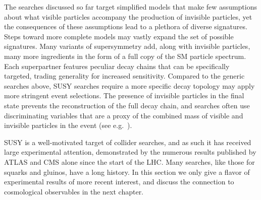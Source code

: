 

The searches discussed so far target simplified models that make few assumptions about what visible particles accompany the production of invisible particles, yet the consequences of these assumptions lead to a plethora of diverse signatures. 
Steps toward more complete models may vastly expand the set of possible signatures. Many variants of supersymmetry add, along with invisible particles, many more ingredients in the form of a full copy of the SM particle spectrum. Each superpartner features peculiar decay chains that can be specifically targeted, trading generality for increased sensitivity. 
Compared to the generic searches above, SUSY searches require a more specific decay topology may apply more stringent event selections. The presence of invisible particles in the final state prevents the reconstruction of the full decay chain, and searches often use discriminating variables that are a proxy of the combined mass of visible and invisible particles in the event (see e.g.~\cite{Lester:1999tx}). 

SUSY is a well-motivated target of collider searches, and as such it has received large experimental attention, demonstrated by the numerous results published by ATLAS and CMS alone since the start of the LHC. 
Many searches, like those for squarks and gluinos, have a long history. 
In this section we only give a flavor of experimental results of more recent interest, and discuss the connection to cosmological observables in the next chapter. 


